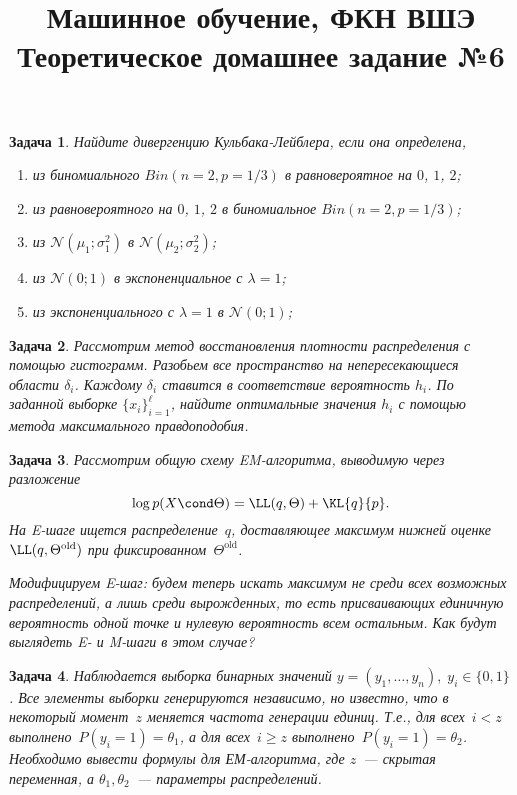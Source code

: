 \documentclass[12pt,fleqn]{article}
\title{Машинное обучение, ФКН ВШЭ\\Теоретическое домашнее задание №6}
\author{}
\date{}
\newtheorem{esProblem}{Задача}
\begin{document}
\maketitle

\begin{esProblem}
    Найдите дивергенцию Кульбака-Лейблера, если она определена,
    \begin{enumerate}
      \item[а)] из биномиального $Bin(n=2, p=1/3)$ в равновероятное на $0$, $1$, $2$;
      \item[б)] из равновероятного на $0$, $1$, $2$ в биномиальное $Bin(n=2, p=1/3)$;
      \item[в)] из $\mathcal{N}(\mu_1; \sigma^2_1)$ в $\mathcal{N}(\mu_2 ;\sigma_2^2)$;
      \item[г)] из $\mathcal{N}(0;1)$ в экспоненциальное с $\lambda=1$;
      \item[д)] из экспоненциального с $\lambda=1$ в $\mathcal{N}(0;1)$;
    \end{enumerate}
\end{esProblem}

\begin{esProblem}
    Рассмотрим метод восстановления плотности распределения с помощью гистограмм.
    Разобьем все пространство на непересекающиеся области $\delta_i$.
    Каждому $\delta_i$ ставится в соответствие вероятность $h_i$.
    По заданной выборке $\{x_i\}_{i=1}^\ell$, найдите оптимальные значения $h_i$ с помощью метода максимального правдоподобия.
\end{esProblem}

\begin{esProblem}
    Рассмотрим общую схему EM-алгоритма,
    выводимую через разложение
    \[
        \log p(X \cond \Theta)
        =
        \LL(q, \Theta)
        +
        \KL{q}{p}.
    \]
    На E-шаге ищется распределение~$q$,
    доставляющее максимум нижней оценке~$\LL(q, \Theta^\text{old})$
    при фиксированном~$\Theta^\text{old}$.

    Модифицируем E-шаг: будем теперь искать максимум не среди всех
    возможных распределений, а лишь среди вырожденных,
    то есть присваивающих единичную вероятность одной точке
    и нулевую вероятность всем остальным.
    Как будут выглядеть E- и M-шаги в этом случае?
\end{esProblem}

\begin{esProblem}
    Наблюдается выборка бинарных значений $y = (y_1, \ldots, y_n), \; y_i \in \{0,1\}$.
    Все элементы выборки генерируются независимо, но известно, что в некоторый момент~$z$ меняется частота генерации единиц.
    Т.е., для всех~$i < z$ выполнено~$P(y_i=1) = \theta_1$, а для всех~$i \geq z$ выполнено~$P(y_i=1) = \theta_2$.
    Необходимо вывести формулы для ЕМ-алгоритма, где $z$~--- скрытая переменная, а $\theta_1, \theta_2$~--- параметры распределений.
\end{esProblem}
\end{document}
